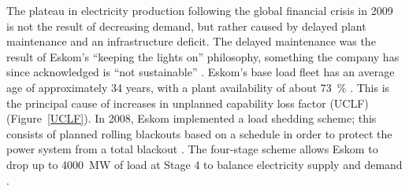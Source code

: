 The plateau in electricity production following the global financial crisis in 2009 is not the result of decreasing demand, but rather caused by delayed plant maintenance and an infrastructure deficit. The delayed maintenance was the result of Eskom's \enquote{keeping the lights on} philosophy, something the company has since acknowledged is \enquote{not sustainable} \cite{Eskom2014}. Eskom's base load fleet has an average age of approximately 34 years, with a plant availability of about \SI{73}{\percent} \cite{Eskom2015c}. This is the principal cause of increases in unplanned capability loss factor (UCLF) (Figure~\ref{UCLF}). In 2008, Eskom implemented a load shedding scheme; this consists of planned rolling blackouts based on a schedule in order to protect the power system from a total blackout \cite{Eskom2015d}. The four-stage scheme allows Eskom to drop up to \SI{4000}{\mega\watt} of load at Stage 4 to balance electricity supply and demand \cite{Eskom2015e}.

